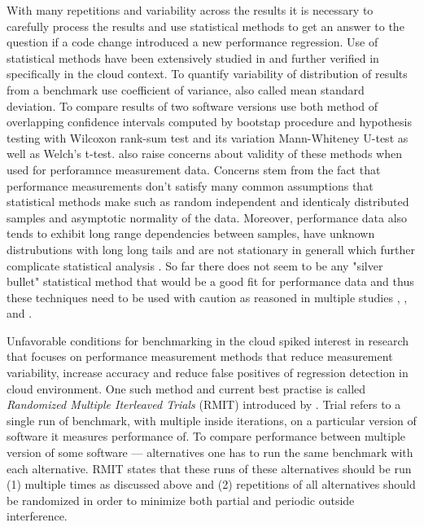 With many repetitions and variability across the results it is necessary to carefully process the results and use statistical methods to get an answer to the question if a code change introduced a new performance regression.
Use of statistical methods have been extensively studied in \citet{bulej2017stat} and further verified in \citet{laaber2019software} specifically in the cloud context.
To quantify variability of distribution of results from a benchmark \citet{laaber2019software} use coefficient of variance, also called mean standard deviation.
To compare results of two software versions \citet{bulej2017stat} use both method of overlapping confidence intervals computed by bootstap procedure and hypothesis testing with Wilcoxon rank-sum test and its variation Mann-Whiteney U-test as well as Welch's t-test.
\citet{bulej2017stat} also raise concerns about validity of these methods when used for perforamnce measurement data.
Concerns stem from the fact that performance measurements don't satisfy many common assumptions that statistical methods make such as random independent and identicaly distributed samples and asymptotic normality of the data.
Moreover, performance data also tends to exhibit long range dependencies between samples, have unknown distrubutions with long long tails and are not stationary in generall which further complicate statistical analysis \cite{bulej2017stat}.
So far there does not seem to be any "silver bullet" statistical method that would be a good fit for performance data and thus these techniques need to be used with caution as reasoned in multiple studies \citet{leitner2016patterns}, \citet{laaber2019software}, and \citet{bulej2017stat}.

Unfavorable conditions for benchmarking in the cloud spiked interest in research that focuses on performance measurement methods that reduce measurement variability, increase accuracy and reduce false positives of regression detection in cloud environment.
One such method and current best practise \cite{laaber2019software} is called \emph{Randomized Multiple Iterleaved Trials} (RMIT) introduced by \citet{abedi2017conducting}.
Trial refers to a single run of benchmark, with multiple inside iterations, on a particular version of software it measures performance of.
To compare performance between multiple version of some software --- alternatives one has to run the same benchmark with each alternative.
RMIT states that these runs of these alternatives should be run (1) multiple times as discussed above and (2) repetitions of all alternatives should be randomized in order to minimize both partial and periodic outside interference.

